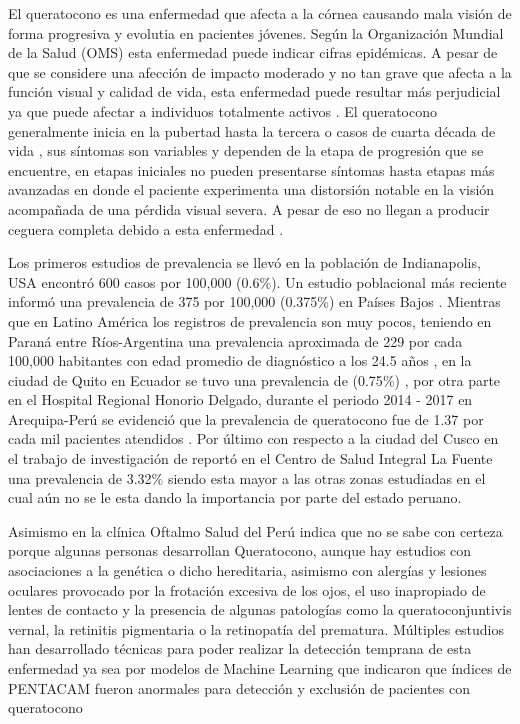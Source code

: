 El queratocono es una enfermedad que afecta a la córnea causando mala visión de forma progresiva y evolutia en pacientes jóvenes. Según la Organización Mundial de la Salud (OMS) esta enfermedad puede indicar cifras epidémicas. A pesar de que se considere una afección de impacto moderado y no tan grave que afecta a la función visual y calidad de vida, esta enfermedad puede resultar más perjudicial ya que puede afectar a individuos totalmente activos \parencite{thalasselis1988keratoconus}. El queratocono generalmente inicia en la pubertad hasta la tercera o casos de cuarta década de vida \parencite{althomali2018prevalence}, sus síntomas son variables y dependen de la etapa de progresión que se encuentre, en etapas iniciales no pueden presentarse síntomas hasta etapas más avanzadas en donde el paciente experimenta una distorsión notable en la visión acompañada de una pérdida visual severa. A pesar de eso no llegan a producir ceguera completa debido a esta enfermedad \parencite{rabinowitz1998keratoconus}. 

Los primeros estudios de prevalencia se llevó en la población de Indianapolis, USA encontró 600 casos por 100,000 (0.6$\%$). Un estudio poblacional más reciente informó una prevalencia de 375 por 100,000 (0.375$\%$) en Países Bajos \parencite{godefrooij2017age}. Mientras que en Latino América  los registros de prevalencia son muy pocos, teniendo en Paraná entre Ríos-Argentina una prevalencia aproximada de 229 por cada 100,000 habitantes con edad promedio de diagnóstico a los 24.5 años \parencite{pussetto2011alta}, en la ciudad de Quito en Ecuador se tuvo una prevalencia de (0.75$\%$) \parencite{mansfield2017queratocono}, por otra parte en el Hospital Regional Honorio Delgado, durante el periodo 2014 - 2017 en Arequipa-Perú se evidenció que la prevalencia de queratocono fue de 1.37 por cada mil pacientes atendidos \parencite{ramos2018prevalencia}. Por último con respecto a la ciudad del Cusco en el trabajo de investigación de \textcite{samaniego2023prevalencia} reportó en el Centro de Salud Integral La Fuente una prevalencia de 3.32$\%$ siendo esta mayor a las otras zonas estudiadas en el cual aún no se le esta dando la importancia por parte del estado peruano.

Asimismo en la clínica Oftalmo Salud del Perú indica que no se sabe con certeza porque algunas personas desarrollan Queratocono, aunque hay estudios con asociaciones a la genética o dicho hereditaria, asimismo con alergías y lesiones oculares provocado por la frotación excesiva de los ojos, el uso inapropiado de lentes de contacto y la presencia de algunas patologías como la queratoconjuntivis vernal, la retinitis pigmentaria o la retinopatía del prematura. Múltiples estudios han desarrollado técnicas para poder realizar la detección temprana de esta enfermedad ya sea por modelos de Machine Learning que indicaron que índices de PENTACAM fueron anormales para detección y exclusión de pacientes con queratocono \parencite{zhao2024evaluation}

